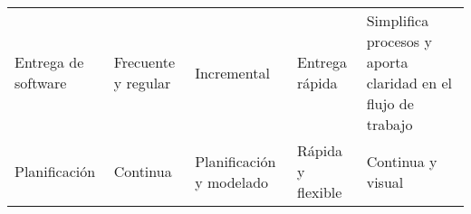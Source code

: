 \begin{longtable}{|p{3cm}|p{2.5cm}|p{2.5cm}|p{2.5cm}|p{2.5cm}|}
    Entrega de software                            & Frecuente y regular                                                                                    & Incremental                                                                                    & Entrega rápida                                                                             & Simplifica procesos y aporta claridad en el flujo de trabajo                            \\
    Planificación                                  & Continua                                                                                               & Planificación y modelado                                                                       & Rápida y flexible                                                                          & Continua y visual                                                                       \\
\end{longtable}